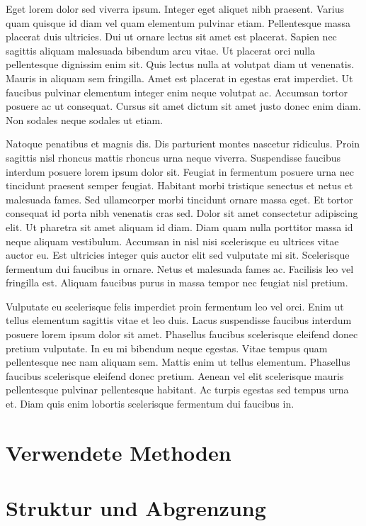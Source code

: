 \documentclass[12pt,ngerman,a4paper,oneside,,tablecaptionabove]{scrbook}
\begin{document}
Eget lorem dolor sed viverra ipsum. Integer eget aliquet nibh praesent.
Varius quam quisque id diam vel quam elementum pulvinar etiam.
Pellentesque massa placerat duis ultricies. Dui ut ornare lectus sit
amet est placerat. Sapien nec sagittis aliquam malesuada bibendum arcu
vitae. Ut placerat orci nulla pellentesque dignissim enim sit. Quis
lectus nulla at volutpat diam ut venenatis. Mauris in aliquam sem
fringilla. Amet est placerat in egestas erat imperdiet. Ut faucibus
pulvinar elementum integer enim neque volutpat ac. Accumsan tortor
posuere ac ut consequat. Cursus sit amet dictum sit amet justo donec
enim diam. Non sodales neque sodales ut etiam.

Natoque penatibus et magnis dis. Dis parturient montes nascetur
ridiculus. Proin sagittis nisl rhoncus mattis rhoncus urna neque
viverra. Suspendisse faucibus interdum posuere lorem ipsum dolor sit.
Feugiat in fermentum posuere urna nec tincidunt praesent semper feugiat.
Habitant morbi tristique senectus et netus et malesuada fames. Sed
ullamcorper morbi tincidunt ornare massa eget. Et tortor consequat id
porta nibh venenatis cras sed. Dolor sit amet consectetur adipiscing
elit. Ut pharetra sit amet aliquam id diam. Diam quam nulla porttitor
massa id neque aliquam vestibulum. Accumsan in nisl nisi scelerisque eu
ultrices vitae auctor eu. Est ultricies integer quis auctor elit sed
vulputate mi sit. Scelerisque fermentum dui faucibus in ornare. Netus et
malesuada fames ac. Facilisis leo vel fringilla est. Aliquam faucibus
purus in massa tempor nec feugiat nisl pretium.

Vulputate eu scelerisque felis imperdiet proin fermentum leo vel orci.
Enim ut tellus elementum sagittis vitae et leo duis. Lacus suspendisse
faucibus interdum posuere lorem ipsum dolor sit amet. Phasellus faucibus
scelerisque eleifend donec pretium vulputate. In eu mi bibendum neque
egestas. Vitae tempus quam pellentesque nec nam aliquam sem. Mattis enim
ut tellus elementum. Phasellus faucibus scelerisque eleifend donec
pretium. Aenean vel elit scelerisque mauris pellentesque pulvinar
pellentesque habitant. Ac turpis egestas sed tempus urna et. Diam quis
enim lobortis scelerisque fermentum dui faucibus in.

\hypertarget{sec:Methoden}{%
\section{Verwendete Methoden}\label{sec:Methoden}}

\hypertarget{sec:Struktur}{%
\section{Struktur und Abgrenzung}\label{sec:Struktur}}
\end{document}
